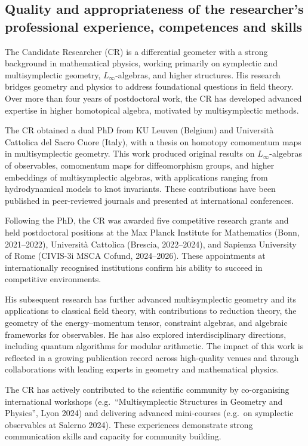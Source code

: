 \documentclass[11pt]{msca-pf}
\begin{document}
\subsection{Quality and appropriateness of the researcher's professional
    experience, competences and skills}
\label{ssc:excellence: researcher}

The Candidate Researcher (CR) is a differential geometer with a strong background in mathematical physics, working primarily on symplectic and multisymplectic geometry, $L_\infty$-algebras, and higher structures. His research bridges geometry and physics to address foundational questions in field theory. Over more than four years of postdoctoral work, the CR has developed advanced expertise in higher homotopical algebra, motivated by multisymplectic methods.

The CR obtained a dual PhD from KU Leuven (Belgium) and Università Cattolica del Sacro Cuore (Italy), with a thesis on homotopy comomentum maps in multisymplectic geometry. This work produced original results on $L_\infty$-algebras of observables, comomentum maps for diffeomorphism groups, and higher embeddings of multisymplectic algebras, with applications ranging from hydrodynamical models to knot invariants. These contributions have been published in peer-reviewed journals and presented at international conferences.

Following the PhD, the CR was awarded five competitive research grants and held postdoctoral positions at the Max Planck Institute for Mathematics (Bonn, 2021–2022), Università Cattolica (Brescia, 2022–2024), and Sapienza University of Rome (CIVIS-3i MSCA Cofund, 2024–2026). These appointments at internationally recognised institutions confirm his ability to succeed in competitive environments.

His subsequent research has further advanced multisymplectic geometry and its applications to classical field theory, with contributions to reduction theory, the geometry of the energy–momentum tensor, constraint algebras, and algebraic frameworks for observables. He has also explored interdisciplinary directions, including quantum algorithms for modular arithmetic. The impact of this work is reflected in a growing publication record across high-quality venues and through collaborations with leading experts in geometry and mathematical physics.

The CR has actively contributed to the scientific community by co-organising international workshops (e.g.\ “Multisymplectic Structures in Geometry and Physics”, Lyon 2024) and delivering advanced mini-courses (e.g.\ on symplectic observables at Salerno 2024). These experiences demonstrate strong communication skills and capacity for community building.  
\end{document}
